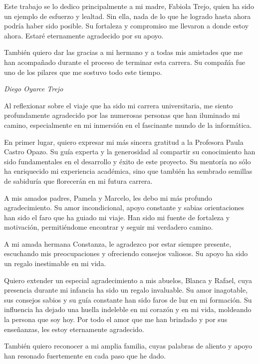 Este trabajo se lo dedico principalmente a mi madre, Fabiola Trejo, quien ha sido un ejemplo de esfuerzo y lealtad. Sin ella, nada de lo que he logrado hasta ahora podría haber sido posible. Su fortaleza y compromiso me llevaron a donde estoy ahora. Estaré eternamente agradecido por su apoyo.

También quiero dar las gracias a mi hermano y a todas mis amistades que me han acompañado durante el proceso de terminar esta carrera. Su compañía fue uno de los pilares que me sostuvo todo este tiempo.

\textit{Diego Oyarce Trejo}


\vspace{2cm}

\newpage
Al reflexionar sobre el viaje que ha sido mi carrera universitaria, me siento profundamente agradecido por las numerosas personas que han iluminado mi camino, especialmente en mi inmersión en el fascinante mundo de la informática.

En primer lugar, quiero expresar mi más sincera gratitud a la Profesora Paula Castro Opazo. Su guía experta y la generosidad al compartir su conocimiento han sido fundamentales en el desarrollo y éxito de este proyecto. Su mentoría no sólo ha enriquecido mi experiencia académica, sino que también ha sembrado semillas de sabiduría que florecerán en mi futura carrera.

A mis amados padres, Pamela y Marcelo, les debo mi más profundo agradecimiento. Su amor incondicional, apoyo constante y sabias orientaciones han sido el faro que ha guiado mi viaje. Han sido mi fuente de fortaleza y motivación, permitiéndome encontrar y seguir mi verdadero camino.

A mi amada hermana Constanza, le agradezco por estar siempre presente, escuchando mis preocupaciones y ofreciendo consejos valiosos. Su apoyo ha sido un regalo inestimable en mi vida.

Quiero extender un especial agradecimiento a mis abuelos, Blanca y Rafael, cuya presencia durante mi infancia ha sido un regalo invaluable. Su amor inagotable, sus consejos sabios y su guía constante han sido faros de luz en mi formación. Su influencia ha dejado una huella indeleble en mi corazón y en mi vida, moldeando la persona que soy hoy. Por todo el amor que me han brindado y por sus enseñanzas, les estoy eternamente agradecido.

También quiero reconocer a mi amplia familia, cuyas palabras de aliento y apoyo han resonado fuertemente en cada paso que he dado.

